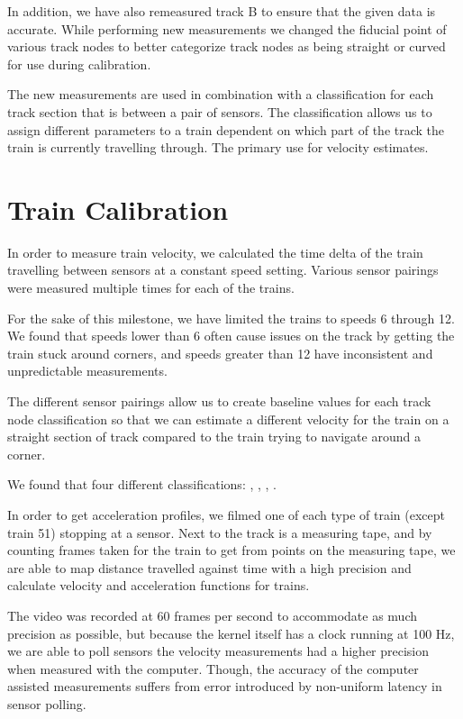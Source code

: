 \documentclass[pdftex,10pt,a4paper]{article}
\begin{document}
In addition, we have also remeasured track B to ensure that the given
data is accurate. While performing new measurements we changed the fiducial
point of various track nodes to better categorize track nodes as being
straight or curved for use during calibration.

The new measurements are used in combination with a classification for each
track section that is between a pair of sensors. The classification
allows us to assign different parameters to a train dependent on which
part of the track the train is currently travelling through. The
primary use for velocity estimates.

\section*{Train Calibration}

In order to measure train velocity, we calculated the time delta of
the train travelling between sensors at a constant speed
setting. Various sensor pairings were measured multiple times for each
of the trains.

For the sake of this milestone, we have limited the trains to speeds 6
through 12. We found that speeds lower than 6 often cause issues on
the track by getting the train stuck around corners, and speeds
greater than 12 have inconsistent and unpredictable measurements.

The different sensor pairings allow us to create baseline values for
each track node classification so that we can estimate a different
velocity for the train on a straight section of track compared to the
train trying to navigate around a corner.

We found that four different classifications: ,
, , .

In order to get acceleration profiles, we filmed one of each type of
train (except train 51) stopping at a sensor. Next to the track is a
measuring tape, and by counting frames taken for the train to get from
points on the measuring tape, we are able to map distance travelled
against time with a high precision and calculate velocity and
acceleration functions for trains.

The video was recorded at 60 frames per second to accommodate as much
precision as possible, but because the kernel itself has a clock
running at 100 Hz, we are able to poll sensors the velocity
measurements had a higher precision when measured with the
computer. Though, the accuracy of the computer assisted measurements
suffers from error introduced by non-uniform latency in sensor polling.
\end{document}
